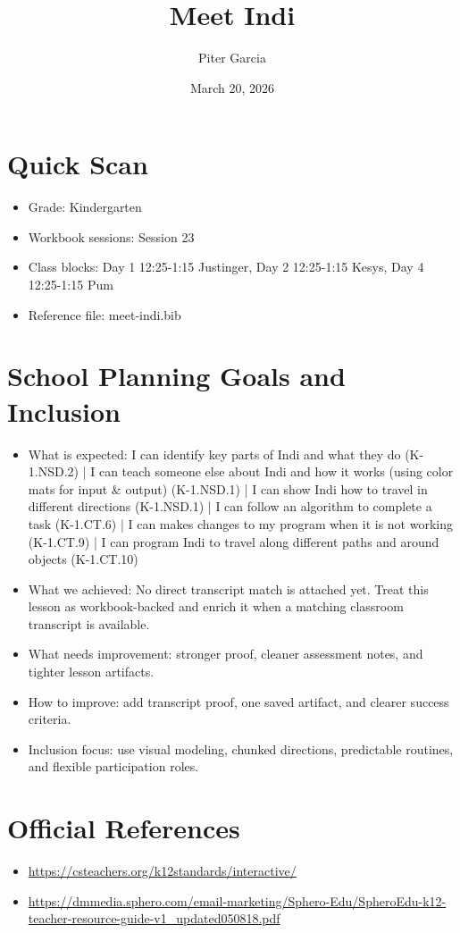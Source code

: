 \documentclass[11pt]{article}
\title{Meet Indi}
\author{Piter Garcia}
\date{March 20, 2026}
\begin{document}
    \maketitle
    \section*{Quick Scan}
    \begin{itemize}[leftmargin=*]
    \item Grade: Kindergarten
    \item Workbook sessions: Session 23
    \item Class blocks: Day 1 12:25-1:15 Justinger, Day 2 12:25-1:15 Kesys, Day 4 12:25-1:15 Pum
    \item Reference file: meet-indi.bib
    \end{itemize}
    \section*{School Planning Goals and Inclusion}
    \begin{itemize}[leftmargin=*]
    \item What is expected: I can identify key parts of Indi and what they do (K-1.NSD.2) | I can teach someone else about Indi and how it works (using color mats for input & output) (K-1.NSD.1) | I can show Indi how to travel in different directions (K-1.NSD.1) | I can follow an algorithm to complete a task (K-1.CT.6) | I can makes changes to my program when it is not working (K-1.CT.9) | I can program Indi to travel along different paths and around objects (K-1.CT.10)
    \item What we achieved: No direct transcript match is attached yet. Treat this lesson as workbook-backed and enrich it when a matching classroom transcript is available.
    \item What needs improvement: stronger proof, cleaner assessment notes, and tighter lesson artifacts.
    \item How to improve: add transcript proof, one saved artifact, and clearer success criteria.
    \item Inclusion focus: use visual modeling, chunked directions, predictable routines, and flexible participation roles.
    \end{itemize}
    \section*{Official References}
    \begin{itemize}[leftmargin=*]
    \item \url{https://csteachers.org/k12standards/interactive/}
\item \url{https://dmmedia.sphero.com/email-marketing/Sphero-Edu/SpheroEdu-k12-teacher-resource-guide-v1_updated050818.pdf}

    \end{itemize}
    
\end{document}

